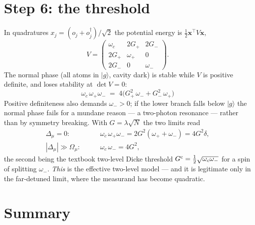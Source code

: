 \documentclass[11pt,a4paper]{article}
\newcommand{\ket}[1]{\lvert #1 \rangle}
\newcommand{\dg}{^{\dagger}}
\newcommand{\Omu}{\Omega_{\mu}}
\newcommand{\Dmu}{\Delta_{\mu}}
\begin{document}
\section{Step 6: the threshold}

In quadratures $x_j=(o_j+o_j\dg)/\sqrt2$ the potential energy is $\tfrac12\bm{x}^{\!\top}V\bm{x}$,
\begin{equation}
  V=\begin{pmatrix}
      \omega_c & 2G_+ & 2G_-\\
      2G_+ & \omega_+ & 0\\
      2G_- & 0 & \omega_-
    \end{pmatrix}.
\end{equation}
The normal phase (all atoms in $\ket{g}$, cavity dark) is stable while $V$ is positive definite,
and loses stability at $\det V=0$:
\begin{equation}
  \boxed{\ \omega_c\,\omega_+\omega_- \;=\; 4\bigl(G_+^2\,\omega_- + G_-^2\,\omega_+\bigr)\ }
  \label{eq:threshold}
\end{equation}
Positive definiteness also demands $\omega_->0$; if the lower branch falls below $\ket{g}$ the
normal phase fails for a mundane reason --- a two-photon resonance --- rather than by symmetry
breaking. With $G=\lambda\sqrt N$ the two limits read
\begin{align}
  \Dmu=0:&\qquad \omega_c\,\omega_+\omega_- = 2G^2(\omega_++\omega_-)=4G^2\delta,\\
  |\Dmu|\gg\Omu:&\qquad \omega_c\,\omega_- = 4G^2 ,
\end{align}
the second being the textbook two-level Dicke threshold $G^{\rm c}=\tfrac12\sqrt{\omega_c\omega_-}$
for a spin of splitting $\omega_-$. \emph{This} is the effective two-level model --- and it is
legitimate only in the far-detuned limit, where the measurand has become quadratic.

\section{Summary}
\end{document}
